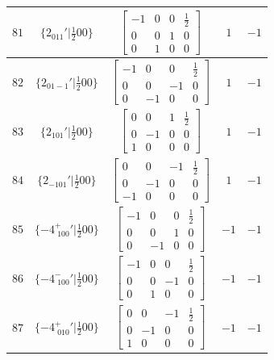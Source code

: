 \documentclass[fleqn,8pt]{jsarticle}
\begin{document}
\begin{longtable}{ccccc}
$ 81 $ & $ \{2{}_{011}{}'|\frac{1}{2} 0 0\} $ & $ \begin{bmatrix} -1 & 0 & 0 & \frac{1}{2} \\ 0 & 0 & 1 & 0 \\ 0 & 1 & 0 & 0 \end{bmatrix} $ & $ 1 $ & $ -1 $ \\ \hline
$ 82 $ & $ \{2{}_{01-1}{}'|\frac{1}{2} 0 0\} $ & $ \begin{bmatrix} -1 & 0 & 0 & \frac{1}{2} \\ 0 & 0 & -1 & 0 \\ 0 & -1 & 0 & 0 \end{bmatrix} $ & $ 1 $ & $ -1 $ \\ \hline
$ 83 $ & $ \{2{}_{101}{}'|\frac{1}{2} 0 0\} $ & $ \begin{bmatrix} 0 & 0 & 1 & \frac{1}{2} \\ 0 & -1 & 0 & 0 \\ 1 & 0 & 0 & 0 \end{bmatrix} $ & $ 1 $ & $ -1 $ \\ \hline
$ 84 $ & $ \{2{}_{-101}{}'|\frac{1}{2} 0 0\} $ & $ \begin{bmatrix} 0 & 0 & -1 & \frac{1}{2} \\ 0 & -1 & 0 & 0 \\ -1 & 0 & 0 & 0 \end{bmatrix} $ & $ 1 $ & $ -1 $ \\ \hline
$ 85 $ & $ \{-4^{+}_{\,\,100}{}'|\frac{1}{2} 0 0\} $ & $ \begin{bmatrix} -1 & 0 & 0 & \frac{1}{2} \\ 0 & 0 & 1 & 0 \\ 0 & -1 & 0 & 0 \end{bmatrix} $ & $ -1 $ & $ -1 $ \\ \hline
$ 86 $ & $ \{-4^{-}_{\,\,100}{}'|\frac{1}{2} 0 0\} $ & $ \begin{bmatrix} -1 & 0 & 0 & \frac{1}{2} \\ 0 & 0 & -1 & 0 \\ 0 & 1 & 0 & 0 \end{bmatrix} $ & $ -1 $ & $ -1 $ \\ \hline
$ 87 $ & $ \{-4^{+}_{\,\,010}{}'|\frac{1}{2} 0 0\} $ & $ \begin{bmatrix} 0 & 0 & -1 & \frac{1}{2} \\ 0 & -1 & 0 & 0 \\ 1 & 0 & 0 & 0 \end{bmatrix} $ & $ -1 $ & $ -1 $ \\ \hline

\end{longtable}
\end{document}
